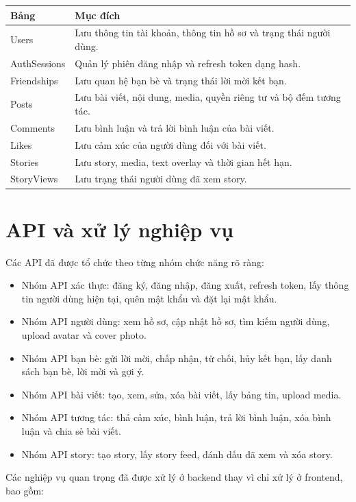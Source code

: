 \documentclass[12pt,a4paper]{article}
\begin{document}
\begin{longtable}{|p{4cm}|p{10cm}|}
\hline
\textbf{Bảng} & \textbf{Mục đích} \\
\hline
Users & Lưu thông tin tài khoản, thông tin hồ sơ và trạng thái người dùng. \\
\hline
AuthSessions & Quản lý phiên đăng nhập và refresh token dạng hash. \\
\hline
Friendships & Lưu quan hệ bạn bè và trạng thái lời mời kết bạn. \\
\hline
Posts & Lưu bài viết, nội dung, media, quyền riêng tư và bộ đếm tương tác. \\
\hline
Comments & Lưu bình luận và trả lời bình luận của bài viết. \\
\hline
Likes & Lưu cảm xúc của người dùng đối với bài viết. \\
\hline
Stories & Lưu story, media, text overlay và thời gian hết hạn. \\
\hline
StoryViews & Lưu trạng thái người dùng đã xem story. \\
\hline
\end{longtable}

\section{API và xử lý nghiệp vụ}

Các API đã được tổ chức theo từng nhóm chức năng rõ ràng:

\begin{itemize}
  \item Nhóm API xác thực: đăng ký, đăng nhập, đăng xuất, refresh token, lấy thông tin người dùng hiện tại, quên mật khẩu và đặt lại mật khẩu.
  \item Nhóm API người dùng: xem hồ sơ, cập nhật hồ sơ, tìm kiếm người dùng, upload avatar và cover photo.
  \item Nhóm API bạn bè: gửi lời mời, chấp nhận, từ chối, hủy kết bạn, lấy danh sách bạn bè, lời mời và gợi ý.
  \item Nhóm API bài viết: tạo, xem, sửa, xóa bài viết, lấy bảng tin, upload media.
  \item Nhóm API tương tác: thả cảm xúc, bình luận, trả lời bình luận, xóa bình luận và chia sẻ bài viết.
  \item Nhóm API story: tạo story, lấy story feed, đánh dấu đã xem và xóa story.
\end{itemize}

Các nghiệp vụ quan trọng đã được xử lý ở backend thay vì chỉ xử lý ở frontend, bao gồm:
\end{document}
